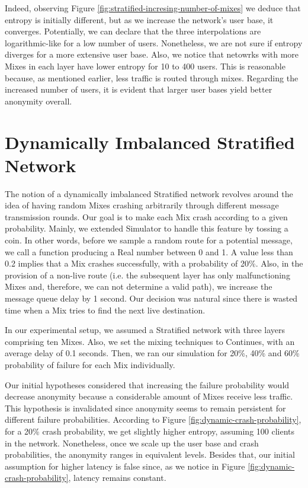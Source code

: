 \documentclass[logo,msc,cyber]{infthesis}   %
\begin{document}
Indeed, observing Figure \ref{fig:stratified-incresing-number-of-mixes} we
deduce that entropy is initially different, but as we increase the network's
user base, it converges. Potentially, we can declare that the three
interpolations are logarithmic-like for a low number of users. Nonetheless, we
are not sure if entropy diverges for a more extensive user base. Also, we notice
that netowrks with more Mixes in each layer have lower entropy for 10 to 400
users. This is reasonable because, as mentioned earlier, less traffic is routed
through mixes. Regarding the increased number of users, it is evident that
larger user bases yield better anonymity overall.


\section{Dynamically Imbalanced Stratified Network}
The notion of a dynamically imbalanced Stratified network revolves around the
idea of having random Mixes crashing arbitrarily through different message
transmission rounds. Our goal is to make each Mix crash according to a given
probability. Mainly, we extended Simulator to handle this feature by tossing a
coin. In other words, before we sample a random route for a potential message,
we call a function producing a Real number between 0 and 1. A value less than
0.2 implies that a Mix crashes successfully, with a probability of 20\%. Also,
in the provision of a non-live route (i.e. the subsequent layer has only
malfunctioning Mixes and, therefore, we can not determine a valid path), we
increase the message queue delay by 1 second. Our decision was natural since
there is wasted time when a Mix tries to find the next live destination.

In our experimental setup, we assumed a Stratified network with three layers
comprising ten Mixes. Also, we set the mixing techniques to Continues, with an
average delay of 0.1 seconds. Then, we ran our simulation for 20\%, 40\% and 60\%
probability of failure for each Mix individually. 

Our initial hypotheses considered that increasing the failure probability would
decrease anonymity because a considerable amount of Mixes receive less traffic.
This hypothesis is invalidated since anonymity seems to remain persistent for
different failure probabilities. According to Figure
\ref{fig:dynamic-crash-probability}, for a 20\% crash probability, we get
slightly higher entropy, assuming 100 clients in the network. Nonetheless, once
we scale up the user base and crash probabilities, the anonymity ranges in
equivalent levels. Besides that, our initial assumption for higher latency is
false since, as we notice in Figure \ref{fig:dynamic-crash-probability}, latency
remains constant. 
\end{document}
